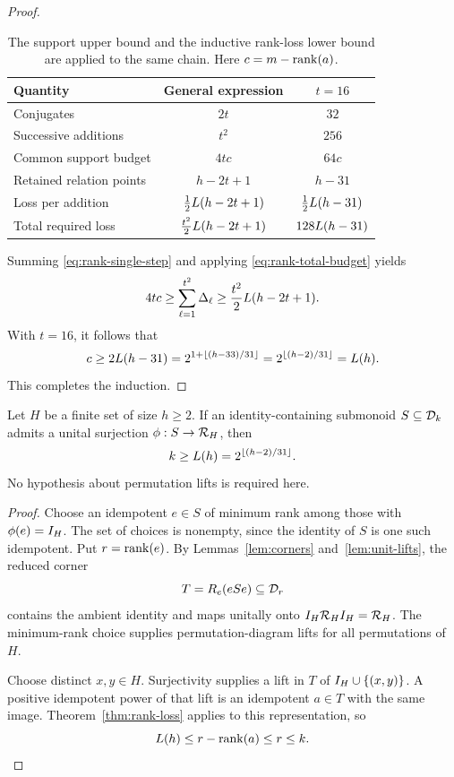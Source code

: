 \begin{proof}
\begin{table}[htbp]
\centering
\renewcommand{\arraystretch}{1.22}
\begin{tabular}{lcc}
\hline
Quantity & General expression & $t=16$ \\
\hline
Conjugates & $2t$ & $32$ \\
Successive additions & $t^2$ & $256$ \\
Common support budget & $4tc$ & $64c$ \\
Retained relation points & $h-2t+1$ & $h-31$ \\
Loss per addition & $\frac12L(h-2t+1)$ & $\frac12L(h-31)$ \\
Total required loss & $\frac{t^2}{2}L(h-2t+1)$ & $128L(h-31)$ \\
\hline
\end{tabular}
\caption{The support upper bound and the inductive rank-loss lower
bound are applied to the same chain. Here $c=m-\operatorname{rank}(a)$.}
\label{tab:rank-budget}
\end{table}

Summing \eqref{eq:rank-single-step} and applying
\eqref{eq:rank-total-budget} yields
\[
 4tc\ge\sum_{\ell=1}^{t^2}\Delta_\ell
      \ge\frac{t^2}{2}L(h-2t+1).
\]
With $t=16$, it follows that
\[
 c\ge2L(h-31)
   =2^{1+\lfloor(h-33)/31\rfloor}
   =2^{\lfloor(h-2)/31\rfloor}
   =L(h).
\]
This completes the induction.
\end{proof}

\begin{corollary}
\label{cor:divisor-degree}
Let $H$ be a finite set of size $h\ge2$. If an identity-containing
submonoid $S\subseteq\mathcal D_{k}$ admits a unital surjection
$\phi:S\to\mathcal R_{H}$, then
\[
 k\ge L(h)=2^{\lfloor(h-2)/31\rfloor}.
\]
No hypothesis about permutation lifts is required here.
\end{corollary}

\begin{proof}
Choose an idempotent $e\in S$ of minimum rank among those with
$\phi(e)=I_{H}$. The set of choices is nonempty, since the identity
of $S$ is one such idempotent. Put $r=\operatorname{rank}(e)$.
By Lemmas~\ref{lem:corners} and~\ref{lem:unit-lifts}, the reduced
corner
\[
 T=R_e(eSe)\subseteq\mathcal D_{r}
\]
contains the ambient identity and maps unitally onto
$I_{H}\mathcal R_{H}I_{H}=\mathcal R_{H}$. The minimum-rank choice supplies
permutation-diagram lifts for all permutations of $H$.

Choose distinct $x,y\in H$. Surjectivity supplies a lift in $T$ of
$I_{H}\cup\{(x,y)\}$. A positive idempotent power of that lift is
an idempotent $a\in T$ with the same image. Theorem~\ref{thm:rank-loss}
applies to this representation, so
\[
 L(h)\le r-\operatorname{rank}(a)\le r\le k.\qedhere
\]
\end{proof}
